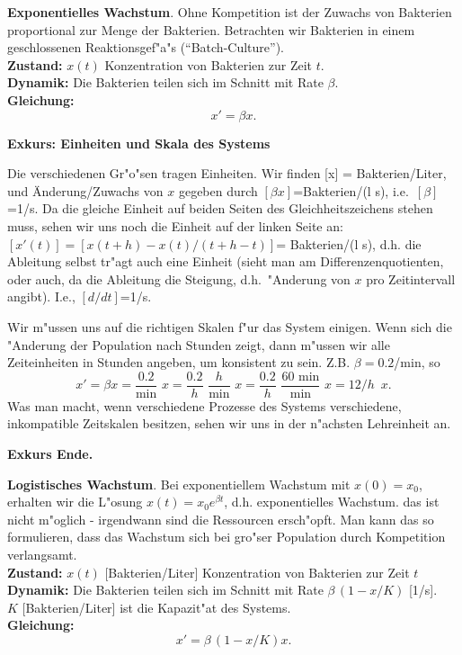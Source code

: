 \begin{bspX}  {\bf Exponentielles Wachstum}. Ohne Kompetition ist der Zuwachs 
von Bakterien proportional zur Menge der Bakterien. Betrachten
wir Bakterien in einem geschlossenen Reaktionsgef"a"s (``Batch-Culture''). \\
{\bf Zustand:} $x(t)$  Konzentration von Bakterien zur Zeit $t$.\\
{\bf Dynamik:} Die Bakterien teilen sich im Schnitt mit Rate $\beta$.\\
{\bf Gleichung:} 
$$ x' = \beta x.$$
\end{bspX}
{\bf Exkurs: Einheiten und Skala des Systems}\par
Die verschiedenen Gr"o"sen tragen Einheiten. Wir finden 
[x] = Bakterien/Liter, und \"Anderung/Zuwachs von $x$ gegeben durch 
$[\beta x]$=Bakterien/(l s), i.e.\ $[\beta]$=1/s. Da die gleiche Einheit 
auf beiden Seiten des Gleichheitszeichens stehen muss, sehen wir uns noch
die Einheit auf der linken Seite an: $[x'(t)] = [x(t+h)-x(t)/(t+h-t)]$=
Bakterien/(l s), d.h. die Ableitung selbst tr"agt auch eine Einheit (sieht man 
am Differenzenquotienten, oder auch, da die Ableitung die Steigung, 
d.h.\ "Anderung von $x$ pro Zeitintervall angibt). I.e., $[d/dt]$=1/s.\par
Wir m"ussen uns auf die richtigen Skalen f"ur das System einigen. Wenn sich 
die "Anderung der Population nach Stunden zeigt, dann m"ussen wir alle 
Zeiteinheiten in Stunden angeben, um konsistent zu sein. Z.B. $\beta=0.2$/min,
so
$$ x' = \beta x = \frac{0.2}{\mbox{min}}\,\, x 
= \frac{0.2}{h}\,\,\frac h{\mbox{min}}\,\, x
= \frac{0.2}{h}\,\,\frac{60 \,\,\mbox{min}}{\mbox{min}}\,\, x
= 12/h\,\,\, x.$$
Was man macht, wenn verschiedene Prozesse des Systems verschiedene, 
 inkompatible Zeitskalen besitzen, sehen wir uns in der n"achsten 
Lehreinheit an.
\par{\bf Exkurs Ende.}\par\medskip

\begin{bspX}  {\bf Logistisches Wachstum}. Bei exponentiellem Wachstum mit 
 $x(0)=x_0$, erhalten wir die L"osung $x(t) = x_0 e^{\beta t}$, d.h. 
exponentielles Wachstum. das ist nicht m"oglich  - irgendwann sind die Ressourcen ersch"opft. 
Man kann das so formulieren, dass
das Wachstum sich bei gro"ser Population durch Kompetition verlangsamt.\\
{\bf Zustand:} $x(t)$ [Bakterien/Liter] Konzentration von Bakterien zur Zeit $t$\\
{\bf Dynamik:} Die Bakterien teilen sich im Schnitt mit Rate $\beta\, (1-x/K)$ [1/s].\\
 $K$ [Bakterien/Liter] ist die Kapazit"at des Systems.\\
{\bf Gleichung:} 
$$ x' = \beta\, (1-x/K) x.$$
\end{bspX}

